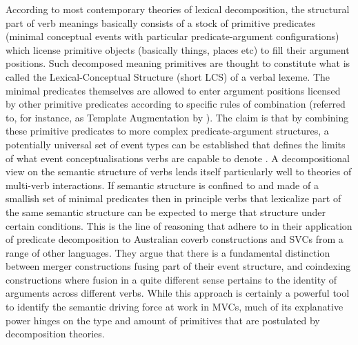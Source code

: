 According to most contemporary theories of lexical decomposition, the structural part of verb meanings basically consists of a stock of primitive predicates (minimal conceptual events with particular predicate-argument configurations) which license primitive objects (basically things, places etc) to fill their argument positions. Such decomposed meaning primitives are thought to constitute what is called the Lexical-Conceptual Structure (short \textsc{LCS}) of a verbal lexeme. The minimal predicates themselves are allowed to enter argument positions licensed by other primitive predicates according to specific rules of combination (referred to, for instance, as Template Augmentation by \citealt[111]{rappaport1998building}). The claim is that by combining these primitive predicates to more complex predicate-argument structures, a potentially universal set of event types can be established that defines the limits of what event conceptualisations verbs are capable to denote \citep{rappaport1998building, baker2010complex}. A decompositional view on the semantic structure of verbs lends itself particularly well to theories of multi-verb interactions. If semantic structure is confined to and made of a smallish set of minimal predicates then in principle verbs that lexicalize part of the same semantic structure can be expected to merge that structure under certain conditions. This is the line of reasoning that \citet{baker2010complex} adhere to in their application of predicate decomposition to Australian coverb constructions and SVCs from a range of other languages. They argue that there is a fundamental distinction between merger constructions fusing part of their event structure, and coindexing constructions where fusion in a quite different sense pertains to the identity of arguments across different verbs. While this approach is certainly a powerful tool to identify the semantic driving force at work in MVCs, much of its explanative power hinges on the type and amount of primitives that are postulated by decomposition theories.

